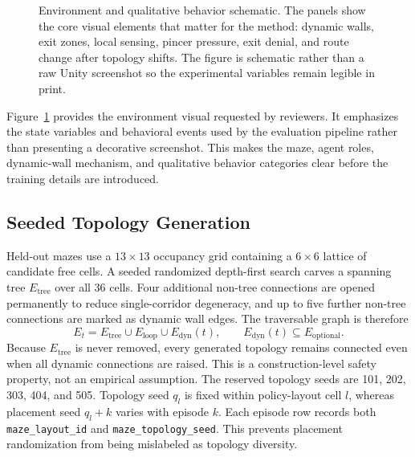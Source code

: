 \documentclass[journal]{IEEEtran}
\begin{document}
\begin{figure}[t]
\caption{Environment and qualitative behavior schematic. The panels show the core visual elements that matter for the method: dynamic walls, exit zones, local sensing, pincer pressure, exit denial, and route change after topology shifts. The figure is schematic rather than a raw Unity screenshot so the experimental variables remain legible in print.}
\label{fig:environment_schematic}
\end{figure}

Figure~\ref{fig:environment_schematic} provides the environment visual requested by reviewers. It emphasizes the state variables and behavioral events used by the evaluation pipeline rather than presenting a decorative screenshot. This makes the maze, agent roles, dynamic-wall mechanism, and qualitative behavior categories clear before the training details are introduced.

\subsection{Seeded Topology Generation}

Held-out mazes use a $13\times13$ occupancy grid containing a $6\times6$ lattice of candidate free cells. A seeded randomized depth-first search carves a spanning tree $E_{\mathrm{tree}}$ over all 36 cells. Four additional non-tree connections are opened permanently to reduce single-corridor degeneracy, and up to five further non-tree connections are marked as dynamic wall edges. The traversable graph is therefore
\begin{equation}
E_t=E_{\mathrm{tree}}\cup E_{\mathrm{loop}}\cup E_{\mathrm{dyn}}(t),
\qquad E_{\mathrm{dyn}}(t)\subseteq E_{\mathrm{optional}}.
\end{equation}
Because $E_{\mathrm{tree}}$ is never removed, every generated topology remains connected even when all dynamic connections are raised. This is a construction-level safety property, not an empirical assumption. The reserved topology seeds are 101, 202, 303, 404, and 505. Topology seed $q_l$ is fixed within policy-layout cell $l$, whereas placement seed $q_l+k$ varies with episode $k$. Each episode row records both \texttt{maze\_layout\_id} and \texttt{maze\_topology\_seed}. This prevents placement randomization from being mislabeled as topology diversity.
\end{document}
